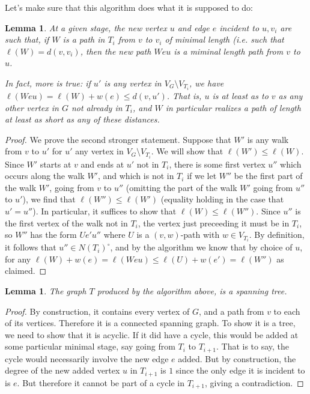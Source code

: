 \documentclass[12pt]{report}
\theoremstyle{plain}
\newtheorem{lem}[thm]{Lemma}
\begin{document}
Let's make sure that this algorithm does what it is supposed to do:
\begin{lem} \label{dijkstra optimality}
At a given stage, the new vertex $u$ and edge $e$ incident to $u, v_i$ are
such that, if $W$ is a path in $T_i$ from $v$ to $v_i$ of minimal length
(i.e. such that $\ell(W)= d(v, v_i)$, then the new path $Weu$ is a miminal
length path from $v$ to $u$.

In fact, more is true: if $u'$ is \textit{any} vertex in $V_G \setminus
V_{T_i}$, we have $\ell(Weu) = \ell(W) + w(e) \leq d(v, u')$. That is, $u$
is at least as to $v$ as any other vertex in $G$ not already in $T_i$, and
$W$ in particular realizes a path of length at least as short as any of
these distances.
\end{lem}
\begin{proof}
We prove the second stronger statement. Suppose that $W'$ is any walk from
$v$ to $u'$ for $u'$ any vertex in $V_G \setminus V_{T_i}$. We will show
that $\ell(W') \leq \ell(W)$. Since $W'$ starts at $v$ and ends at $u'$ not
in $T_i$, there is some first vertex $u''$ which occurs along the walk
$W'$, and which is not in $T_i$ if we let $W''$ be the first part of the
walk $W'$, going from $v$ to $u''$ (omitting the part of the walk $W'$
going from $u''$ to $u'$), we find that $\ell(W'') \leq \ell(W')$ (equality
holding in the case that $u' = u''$). In particular, it suffices to show
that $\ell(W) \leq \ell(W'')$. Since $u''$ is the first vertex of the walk
not in $T_i$, the vertex just preceeding it must be in $T_i$, so $W''$ has
the form $U e'u''$ where $U$ is a $(v, w)$-path with $w \in V_{T_i}$. By
definition, it follows that $u'' \in N(T_i)^\circ$, and by the algorithm we
know that by choice of $u$, for any $\ell(W) + w(e) = \ell(Weu) \leq
\ell(U) + w(e') = \ell(W'')$ as claimed.
\end{proof}

\begin{lem}
The graph $T$ produced by the algorithm above, is a spanning tree.
\end{lem}
\begin{proof}
By construction, it contains every vertex of $G$, and a path from $v$ to
each of its vertices. Therefore it is a connected spanning graph. To show
it is a tree, we need to show that it is acyclic.  If it did have a cycle,
this would be added at some particular minimal stage, say going from $T_i$
to $T_{i+1}$. That is to say, the cycle would necessarily involve the new
edge $e$ added. But by construction, the degree of the new added vertex $u$
in $T_{i+1}$ is $1$ since the only edge it is incident to is $e$. But
therefore it cannot be part of a cycle in $T_{i+1}$, giving a
contradiction.
\end{proof}
\end{document}

